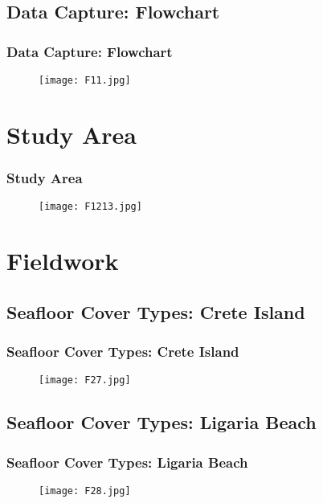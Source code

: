 \documentclass[pdflatex,compress,9pt,
	xcolor={dvipsnames,dvipsnames,svgnames,x11names,table},
	hyperref={colorlinks = true,breaklinks = true, urlcolor = NavyBlue, breaklinks = true}]{beamer}
\begin{document}
\subsection{Data Capture: Flowchart}
\begin{frame}\frametitle{Data Capture: Flowchart}
\begin{figure}[H]
	\centering
		\texttt{[image: F11.jpg]}
\end{figure}
\end{frame}

\section{Study Area}
\begin{frame}\frametitle{Study Area}
\begin{figure}[H]
	\centering
		\texttt{[image: F1213.jpg]}
\end{figure}
\end{frame}

\section{Fieldwork}
\subsection{Seafloor Cover Types: Crete Island}
\begin{frame}\frametitle{Seafloor Cover Types: Crete Island}
\begin{figure}[H]
	\centering
		\texttt{[image: F27.jpg]}
\end{figure}
\end{frame}

\subsection{Seafloor Cover Types: Ligaria Beach}
\begin{frame}\frametitle{Seafloor Cover Types: Ligaria Beach}
\begin{figure}[H]
	\centering
		\texttt{[image: F28.jpg]}
\end{figure}
\end{frame}
\end{document}
